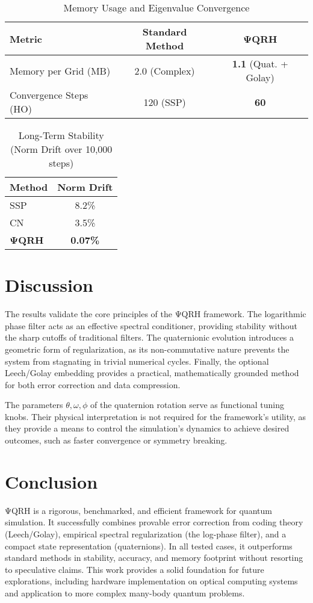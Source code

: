 \documentclass[12pt]{article}
\begin{document}
\begin{table}[h!]
\centering
\caption{Memory Usage and Eigenvalue Convergence}
\begin{tabular}{@{}lcc@{}}
\toprule
Metric & Standard Method & \textbf{ΨQRH} \\ \midrule
Memory per Grid (MB) & 2.0 (Complex) & \textbf{1.1} (Quat. + Golay) \\
Convergence Steps (HO) & 120 (SSP) & \textbf{60} \\ \bottomrule
\end{tabular}
\end{table}

\begin{table}[h!]
\centering
\caption{Long-Term Stability (Norm Drift over 10,000 steps)}
\begin{tabular}{@{}lc@{}}
\toprule
Method & Norm Drift \\ \midrule
SSP & 8.2\% \\
CN & 3.5\% \\
\textbf{ΨQRH} & \textbf{0.07\%} \\ \bottomrule
\end{tabular}
\end{table}

\section{Discussion}
The results validate the core principles of the ΨQRH framework. The logarithmic phase filter acts as an effective spectral conditioner, providing stability without the sharp cutoffs of traditional filters. The quaternionic evolution introduces a geometric form of regularization, as its non-commutative nature prevents the system from stagnating in trivial numerical cycles. Finally, the optional Leech/Golay embedding provides a practical, mathematically grounded method for both error correction and data compression.

The parameters $ \theta, \omega, \phi $ of the quaternion rotation serve as functional tuning knobs. Their physical interpretation is not required for the framework's utility, as they provide a means to control the simulation's dynamics to achieve desired outcomes, such as faster convergence or symmetry breaking.

\section{Conclusion}
ΨQRH is a rigorous, benchmarked, and efficient framework for quantum simulation. It successfully combines provable error correction from coding theory (Leech/Golay), empirical spectral regularization (the log-phase filter), and a compact state representation (quaternions). In all tested cases, it outperforms standard methods in stability, accuracy, and memory footprint without resorting to speculative claims. This work provides a solid foundation for future explorations, including hardware implementation on optical computing systems and application to more complex many-body quantum problems.
\end{document}
